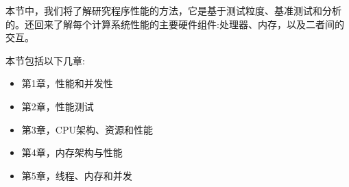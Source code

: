 本节中，我们将了解研究程序性能的方法，它是基于测试粒度、基准测试和分析的。还回来了解每个计算系统性能的主要硬件组件:处理器、内存，以及二者间的交互。

本节包括以下几章:

\begin{itemize}
\item 第1章，性能和并发性
\item 第2章，性能测试
\item 第3章，CPU架构、资源和性能
\item 第4章，内存架构与性能
\item 第5章，线程、内存和并发
\end{itemize}